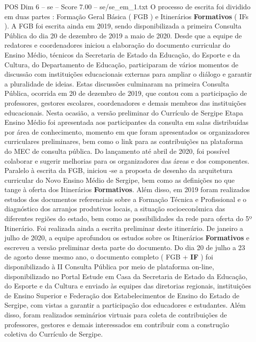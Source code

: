 \begin{textsample}{POS Dim 6 – se – Score 7.00 – se/se\_em\_1.txt}
O processo de escrita foi dividido em duas partes : Formação Geral Básica ( FGB ) e Itinerários \textbf{Formativos} ( IFs ).
A FGB foi escrita ainda em 2019, sendo disponibilizada a primeira Consulta Pública do dia 20 de dezembro de 2019 a maio de 2020.
Desde que a equipe de redatores e coordenadores iniciou a elaboração do documento curricular do Ensino Médio, técnicos da Secretaria de Estado da Educação, do Esporte e da Cultura, do Departamento de Educação, participaram de vários momentos de discussão com instituições educacionais externas para ampliar o diálogo e garantir a pluralidade de ideias.
Estas discussões culminaram na primeira Consulta Pública, ocorrida em 20 de dezembro de 2019, que contou com a participação de professores, gestores escolares, coordenadores e demais membros das instituições educacionais.
Nesta ocasião, a versão preliminar do Currículo de Sergipe Etapa Ensino Médio foi apresentada aos participantes da consulta em salas distribuídas por área de conhecimento, momento em que foram apresentados os organizadores curriculares preliminares, bem como o link para as contribuições na plataforma do MEC de consulta pública.
Do lançamento até abril de 2020, foi possível colaborar e sugerir melhorias para os organizadores das áreas e dos componentes.
Paralelo à escrita da FGB, iniciou -se a proposta de desenho da arquitetura curricular do Novo Ensino Médio de Sergipe, bem como as definições no que tange à oferta dos Itinerários \textbf{Formativos}.
Além disso, em 2019 foram realizados estudos dos documentos referenciais sobre a Formação Técnica e Profissional e o diagnóstico dos arranjos produtivos locais, a situação socioeconômica das diferentes regiões do estado, bem como as possibilidades da rede para oferta do 5º Itinerário.
Foi realizada ainda a escrita preliminar deste itinerário.
De janeiro a julho de 2020, a equipe aprofundou os estudos sobre os Itinerários \textbf{Formativos} e escreveu a versão preliminar desta parte do documento.
Do dia 20 de julho a 23 de agosto desse mesmo ano, o documento completo ( FGB + \textbf{IF} ) foi disponibilizado à II Consulta Pública por meio de plataforma on-line, disponibilizado no Portal Estude em Casa da Secretaria de Estado da Educação, do Esporte e da Cultura e enviado às equipes das diretorias regionais, instituições de Ensino Superior e Federação dos Estabelecimentos de Ensino do Estado de Sergipe, com vistas a garantir a participação dos educadores e estudantes.
Além disso, foram realizados seminários virtuais para coleta de contribuições de professores, gestores e demais interessados em contribuir com a construção coletiva do Currículo de Sergipe.

\end{textsample}
